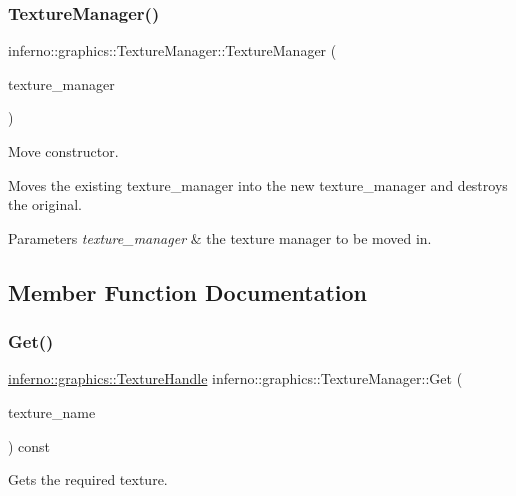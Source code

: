 \subsubsection{\texorpdfstring{Texture\+Manager()}{TextureManager()}\hspace{0.1cm}{\footnotesize\ttfamily [3/3]}}
{\footnotesize\ttfamily inferno\+::graphics\+::\+Texture\+Manager\+::\+Texture\+Manager (\begin{DoxyParamCaption}\item[{\mbox{\hyperlink{classinferno_1_1graphics_1_1_texture_manager}{Texture\+Manager}} \&\&}]{texture\+\_\+manager }\end{DoxyParamCaption})\hspace{0.3cm}{\ttfamily [inline]}}



Move constructor. 

Moves the existing texture\+\_\+manager into the new texture\+\_\+manager and destroys the original. 
\begin{DoxyParams}{Parameters}
{\em texture\+\_\+manager} & the texture manager to be moved in. \\
\hline
\end{DoxyParams}


\subsection{Member Function Documentation}
\mbox{\label{classinferno_1_1graphics_1_1_texture_manager_ae2b18c9725addce31e35034ea6642fbf}} 
\subsubsection{\texorpdfstring{Get()}{Get()}}
{\footnotesize\ttfamily \mbox{\hyperlink{namespaceinferno_1_1graphics_a9d719bfbfedd17b9ace9b8d603ab5a38}{inferno\+::graphics\+::\+Texture\+Handle}} inferno\+::graphics\+::\+Texture\+Manager\+::\+Get (\begin{DoxyParamCaption}\item[{std\+::string}]{texture\+\_\+name }\end{DoxyParamCaption}) const}



Gets the required texture. 

